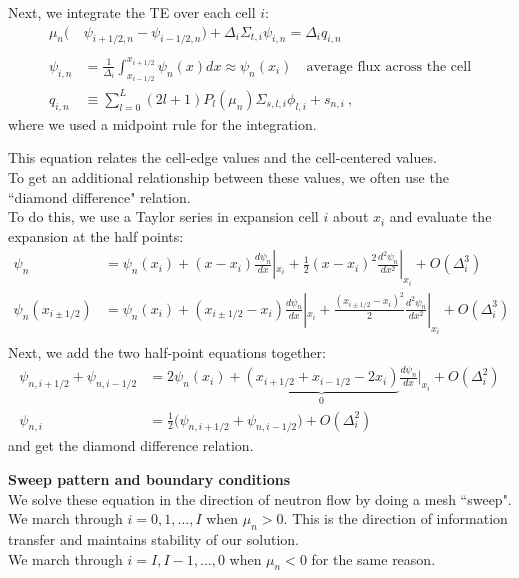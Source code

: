 \documentclass[12pt]{article}
\begin{document}
%
Next, we integrate the TE over each cell $i$:
\begin{align*}
\mu_n\bigl(&\psi_{i+1/2,n} - \psi_{i-1/2,n} \bigr) + \Delta_i \Sigma_{t,i} \psi_{i,n} = \Delta_i q_{i,n}\\
&\\
\psi_{i,n} &= \frac{1}{\Delta_i}\int_{x_{i-1/2}}^{x_{i+1/2}} \psi_n(x) dx \approx \psi_n(x_i) \quad \text{average flux across the cell}\\
q_{i,n} &\equiv \sum_{l=0}^L (2l+1) P_l(\mu_n) \Sigma_{s,l,i} \phi_{l,i} + s_{n,i}\:,
\end{align*}
where we used a midpoint rule for the integration.

This equation relates the cell-edge values and the cell-centered values.\\
To get an additional relationship between these values, we often use the ``diamond difference" relation.\\
To do this, we use a Taylor series in expansion cell $i$ about $x_i$ and evaluate the expansion at the half points:
\begin{align*}
\psi_n &= \psi_n(x_i) + (x - x_i)\frac{d\psi_n}{dx}|_{x_i} + \frac{1}{2}(x - x_i)^2 \frac{d^2 \psi_n}{dx^2}|_{x_i} + O(\Delta_i^3)\\
\psi_{n}(x_{i \pm 1/2}) &= \psi_n(x_i) + (x_{i \pm 1/2} - x_i) \frac{d\psi_n}{dx}|_{x_i} + \frac{(x_{i\pm 1/2} - x_i)^2}{2} \frac{d^2 \psi_n}{dx^2}|_{x_i} + O(\Delta_i^3)\\
\end{align*}
Next, we add the two half-point equations together:
\begin{align*}
\psi_{n, i+1/2} + \psi_{n, i-1/2} &= 2\psi_n(x_i) + \underbrace{(x_{i+1/2} + x_{i-1/2} - 2x_i)}_{0} \frac{d \psi_n}{dx}|_{x_i} + O(\Delta_i^2)\\
\psi_{n, i} &= \frac{1}{2}\bigl(\psi_{n,i+1/2} + \psi_{n,i-1/2}\bigr) + O(\Delta_i^2)
\end{align*}
and get the diamond difference relation.

\textbf{Sweep pattern and boundary conditions}\\
We solve these equation in the direction of neutron flow by doing a mesh ``sweep". \\
We march through $i = 0, 1, \dots, I$ when $\mu_n > 0$. This is the direction of information transfer and maintains stability of our solution.\\
We march through $i = I, I-1, \dots, 0$ when $\mu_n < 0$ for the same reason.
\end{document}
